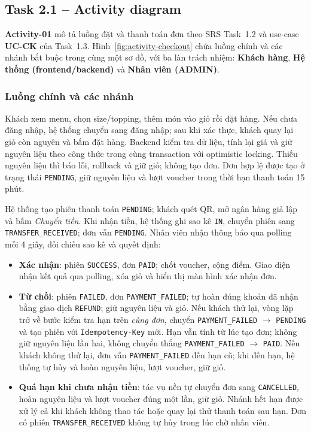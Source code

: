 \subsection{Task 2.1 -- Activity diagram}

\textbf{Activity-01} mô tả luồng đặt và thanh toán đơn theo SRS Task~1.2
và use-case \textbf{UC-CK} của Task~1.3.
Hình~\ref{fig:activity-checkout} chứa luồng chính và các nhánh bắt buộc
trong cùng một sơ đồ, với ba làn trách nhiệm:
\textbf{Khách hàng}, \textbf{Hệ thống (frontend/backend)}
và \textbf{Nhân viên (ADMIN)}.

\subsubsection{Luồng chính và các nhánh}

Khách xem menu, chọn size/topping, thêm món vào giỏ rồi đặt hàng.
Nếu chưa đăng nhập, hệ thống chuyển sang đăng nhập; sau khi xác thực,
khách quay lại giỏ còn nguyên và bấm đặt hàng.
Backend kiểm tra dữ liệu, tính lại giá và giữ nguyên liệu theo công thức
trong cùng transaction với optimistic locking.
Thiếu nguyên liệu thì báo lỗi, rollback và giữ giỏ; không tạo đơn.
Đơn hợp lệ được tạo ở trạng thái \texttt{PENDING}, giữ nguyên liệu
và lượt voucher trong thời hạn thanh toán 15 phút.

Hệ thống tạo phiên thanh toán \texttt{PENDING}; khách quét QR,
mở ngân hàng giả lập và bấm \emph{Chuyển tiền}.
Khi nhận tiền, hệ thống ghi sao kê \texttt{IN}, chuyển phiên sang
\texttt{TRANSFER\_RECEIVED}; đơn vẫn \texttt{PENDING}.
Nhân viên nhận thông báo qua polling mỗi 4 giây, đối chiếu sao kê
và quyết định:
\begin{itemize}
  \item \textbf{Xác nhận}: phiên \texttt{SUCCESS}, đơn \texttt{PAID};
    chốt voucher, cộng điểm. Giao diện nhận kết quả qua polling,
    xóa giỏ và hiển thị màn hình xác nhận đơn.
  \item \textbf{Từ chối}: phiên \texttt{FAILED},
    đơn \texttt{PAYMENT\_FAILED}; tự hoàn đúng khoản đã nhận bằng
    giao dịch \texttt{REFUND}; giữ nguyên liệu và giỏ.
    Nếu khách thử lại, vòng lặp trở về bước kiểm tra hạn trên
    \emph{cùng đơn}, chuyển \texttt{PAYMENT\_FAILED}
    $\rightarrow$ \texttt{PENDING} và tạo phiên với
    \texttt{Idempotency-Key} mới. Hạn vẫn tính từ lúc tạo đơn;
    không giữ nguyên liệu lần hai, không chuyển thẳng
    \texttt{PAYMENT\_FAILED} $\rightarrow$ \texttt{PAID}.
    Nếu khách không thử lại, đơn vẫn \texttt{PAYMENT\_FAILED}
    đến hạn cũ; khi đến hạn, hệ thống tự hủy và hoàn nguyên liệu,
    lượt voucher, giữ giỏ.
  \item \textbf{Quá hạn khi chưa nhận tiền}: tác vụ nền tự chuyển đơn
    sang \texttt{CANCELLED}, hoàn nguyên liệu và lượt voucher
    đúng một lần, giữ giỏ. Nhánh hết hạn được xử lý cả khi khách
    không thao tác hoặc quay lại thử thanh toán sau hạn.
    Đơn có phiên \texttt{TRANSFER\_RECEIVED} không tự hủy
    trong lúc chờ nhân viên.
\end{itemize}

